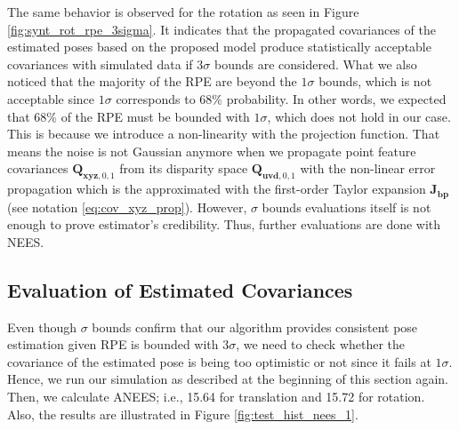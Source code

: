 \documentclass[12pt]{report}
\numberwithin{figure}{section}
\begin{document}
The same behavior is observed for the rotation as seen in Figure 
\ref{fig:synt_rot_rpe_3sigma}. It indicates that the propagated covariances of 
the estimated poses based on the proposed model produce statistically 
acceptable covariances with simulated data if $3\sigma$ bounds are 
considered.  What we also noticed that the majority of the RPE are beyond the 
$1\sigma$ bounds, which is not acceptable since $1\sigma$ corresponds to 68\% 
probability.  In other words, we expected that 68\% of the RPE must be bounded 
with $1\sigma$, which does not hold in our case. This is because we introduce 
a non-linearity with the projection function. That means the noise is not 
Gaussian anymore when we propagate point feature covariances 
$\mathbf{Q}_{\mathbf{xyz},0,1}$ from its disparity space 
$\mathbf{Q}_{\mathbf{uvd},0,1}$ with the non-linear error propagation which is 
the approximated with the first-order Taylor expansion $\mathbf{J_{bp}}$ (see 
notation \eqref{eq:cov_xyz_prop}).  However, $\sigma$ bounds evaluations 
itself is not enough to prove estimator's credibility. Thus, further 
evaluations are done with NEES.

\subsection{Evaluation of Estimated Covariances}

Even though $\sigma$ bounds confirm that our algorithm provides consistent 
pose estimation given RPE is bounded with $3\sigma$, we need to check whether 
the covariance of the estimated pose is being too optimistic or not since it 
fails at $1\sigma$.  Hence, we run our simulation as described at the 
beginning of this section again.  Then, we calculate ANEES; i.e., 15.64 for 
translation and 15.72 for rotation.  Also, the results are illustrated in 
Figure \ref{fig:test_hist_nees_1}.
\end{document}
